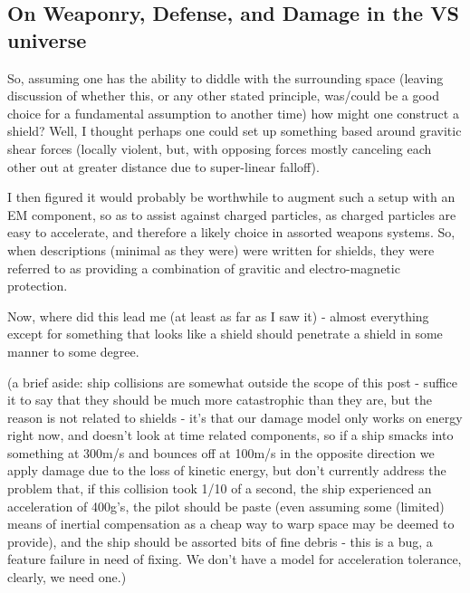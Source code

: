 \subsection{On Weaponry, Defense, and Damage in the VS universe}

So, assuming one has the ability to diddle with the surrounding space
(leaving discussion of whether this, or any other stated principle,
was/could be a good choice for a fundamental assumption to another
time) how might one construct a shield?  Well, I thought perhaps one
could set up something based around gravitic shear forces (locally
violent, but, with opposing forces mostly canceling each other out at
greater distance due to super-linear falloff).

I then figured it would probably be worthwhile to augment such a setup
with an EM component, so as to assist against charged particles, as
charged particles are easy to accelerate, and therefore a likely
choice in assorted weapons systems. So, when descriptions (minimal as
they were) were written for shields, they were referred to as
providing a combination of gravitic and electro-magnetic protection.

Now, where did this lead me (at least as far as I saw it) - almost
everything except for something that looks like a shield should
penetrate a shield in some manner to some degree.

(a brief aside: ship collisions are somewhat outside the scope of this
post - suffice it to say that they should be much more catastrophic
than they are, but the reason is not related to shields - it's that
our damage model only works on energy right now, and doesn't look at
time related components, so if a ship smacks into something at 300m/s
and bounces off at 100m/s in the opposite direction we apply damage
due to the loss of kinetic energy, but don't currently address the
problem that, if this collision took 1/10 of a second, the ship
experienced an acceleration of 400g's, the pilot should be paste (even
assuming some (limited) means of inertial compensation as a cheap way
to warp space may be deemed to provide), and the ship should be
assorted bits of fine debris - this is a bug, a feature failure in
need of fixing. We don't have a model for acceleration tolerance,
clearly, we need one.)


